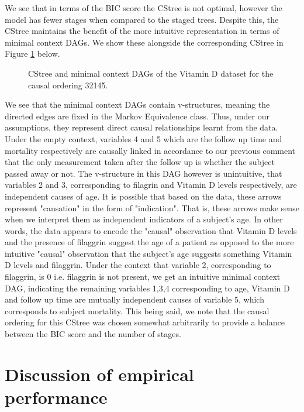 \documentclass{tufte-book}
\begin{document}
We see that in terms of the BIC score the CStree is not optimal, however the model has fewer stages when compared to the staged trees. Despite this, the CStree maintains the benefit of the more intuitive representation in terms of minimal context DAGs. We show these alongside the corresponding CStree in Figure \ref{fig:vitd_mcdags} below.

\begin{figure}[!h]\label{fig:vitd_mcdags}
   \begin{floatrow}
%
\caption{ CStree and minimal context DAGs of the Vitamin D dataset for the causal ordering 32145. }
        
   \end{floatrow}
\end{figure}


We see that the minimal context DAGs contain v-structures, meaning the directed edges are fixed in the Markov Equivalence class. Thus, under our assumptions, they represent direct causal relationships learnt from the data. Under the empty context, variables 4 and 5 which are the follow up time and mortality respectively are causally linked in accordance to our previous comment that the only measurement taken after the follow up is whether the subject passed away or not. The v-structure in this DAG however is unintuitive, that variables 2 and 3, corresponding to filagrin and Vitamin D levels respectively, are independent causes of age. It is possible that based on the data, these arrows represent "causation" in the form of "indication". That is, these arrows make sense when we interpret them as independent indicators of a subject's age. In other words, the data appears to encode the "causal" observation that Vitamin D levels and the presence of filaggrin suggest the age of a patient as opposed to the more intuitive "causal" observation that the subject's age suggests something Vitamin D levels and filaggrin. Under the context that variable 2, corresponding to filaggrin, is 0 i.e. filaggrin is not present, we get an intuitive minimal context DAG, indicating the remaining variables 1,3,4 corresponding to age, Vitamin D and follow up time are mutually independent causes of variable 5, which corresponds to subject mortality. This being said, we note that the causal ordering for this CStree was chosen somewhat arbitrarily to provide a balance between the BIC score and the number of stages.


\section{Discussion of empirical performance}
\label{sec:org0496c09}
\end{document}
